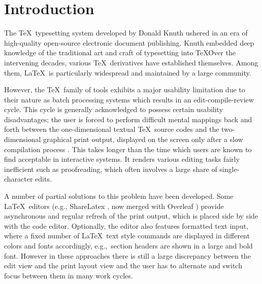 \documentclass[sigconf]{acmart}
\newcommand{\eg}{e.g.,\ }
\begin{document}



\maketitle


\section{Introduction}  

The \TeX\ typesetting system developed by Donald Knuth ushered in an era of high-quality open-source electronic document publishing. 
Knuth embedded  deep knowledge of the traditional art and craft of typesetting into \TeX\. 
Over the intervening decades, various \TeX\ derivatives have established themselves. 
Among them, \LaTeX\ is particularly widespread and maintained by a large community.



However, the \TeX\ family of tools exhibits a major usability limitation due to their nature as batch processing systems which results in an edit-compile-review cycle. 
This cycle is generally acknowledged to possess certain usability disadvantages; 
the user is forced to perform difficult mental mappings back and forth between the one-dimensional textual \TeX\ source codes and the two-dimensional graphical print output, displayed on the screen only after a slow compilation process \cite{brown2013integrated}. This takes longer than the time which users are known to find acceptable in interactive systems. It renders various editing tasks fairly inefficient such as proofreading, which often involves a large share of single-character edits.

A number of partial solutions to  this problem have been developed. 
Some \LaTeX\ editors (e.g., ShareLatex \cite{oswaldsharelatex}, now merged with Overleaf \cite{overleaf}) provide asynchronous and regular refresh of the print output, which is placed side by side with the code editor. 
Optionally, the editor also features formatted text input, %
where a fixed number of \LaTeX\ text style commands 
are displayed in different colors and fonts accordingly, \eg section headers are shown in a large and bold font.
However in these approaches there is still a large discrepancy between the edit view and the print layout view and the user has to alternate and switch focus between them in many work cycles. 
\end{document}
